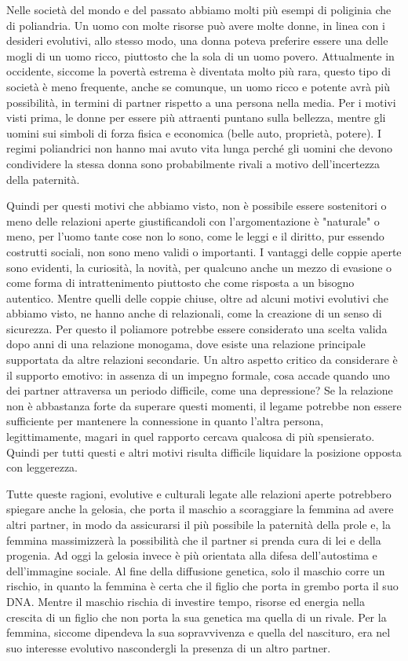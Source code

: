\documentclass[12pt]{book} %
\begin{document}
Nelle società del mondo e del passato abbiamo molti più esempi di poliginia che di poliandria. Un uomo con molte risorse
può avere molte donne, in linea con i desideri evolutivi, allo stesso modo, una donna poteva preferire essere una delle
mogli di un uomo ricco, piuttosto che la sola di un uomo povero. Attualmente in occidente, siccome la povertà estrema è
diventata molto più rara, questo tipo di società è meno frequente, anche se comunque, un uomo ricco e potente avrà più
possibilità, in termini di partner rispetto a una persona nella media. Per i motivi visti prima, le donne per essere
più attraenti puntano sulla bellezza, mentre gli uomini sui simboli di forza fisica e economica (belle auto, proprietà,
potere). I regimi poliandrici non hanno mai avuto vita lunga perché gli uomini che devono condividere la stessa donna
sono probabilmente rivali a motivo dell'incertezza della paternità.

Quindi per questi motivi che abbiamo visto, non è possibile essere sostenitori o meno delle relazioni aperte giustificandoli con l'argomentazione è "naturale" o meno, per l'uomo tante cose non lo sono, come le leggi e il diritto, pur essendo costrutti sociali, non sono meno validi o importanti. I vantaggi delle coppie aperte sono evidenti, la curiosità, la novità, per qualcuno anche un mezzo di evasione o come forma di intrattenimento piuttosto che come risposta a un bisogno autentico. Mentre quelli delle coppie chiuse, oltre ad alcuni motivi evolutivi che abbiamo visto, ne hanno anche di relazionali, come la creazione di un senso di sicurezza. Per questo il poliamore potrebbe essere considerato una scelta valida dopo anni di una relazione monogama, dove esiste una relazione principale supportata da altre relazioni secondarie.
Un altro aspetto critico da considerare è il supporto emotivo: in assenza di un impegno formale, cosa accade quando uno dei partner attraversa un periodo difficile, come una depressione? Se la relazione non è abbastanza forte da superare questi momenti, il legame potrebbe non essere sufficiente per mantenere la connessione in quanto l'altra persona, legittimamente, magari in quel rapporto cercava qualcosa di più spensierato. Quindi per tutti questi e altri motivi risulta difficile liquidare la posizione opposta con leggerezza.

Tutte queste ragioni, evolutive e culturali legate alle relazioni aperte potrebbero spiegare anche la gelosia, che porta il maschio a scoraggiare la femmina ad avere altri
partner, in modo da assicurarsi il più possibile la paternità della prole e, la femmina massimizzerà la possibilità che
il partner si prenda cura di lei e della progenia. Ad oggi la gelosia invece è più orientata alla difesa
dell'autostima e dell'immagine sociale. Al fine della diffusione genetica,
solo il maschio corre un rischio, in quanto la femmina è certa che il figlio che porta in grembo porta il suo DNA.
Mentre il maschio rischia di investire tempo, risorse ed energia nella crescita di un figlio che non porta la sua
genetica ma quella di un rivale. Per la femmina, siccome dipendeva la sua sopravvivenza e quella del nascituro, era nel
suo interesse evolutivo nascondergli la presenza di un altro partner.
\end{document}
